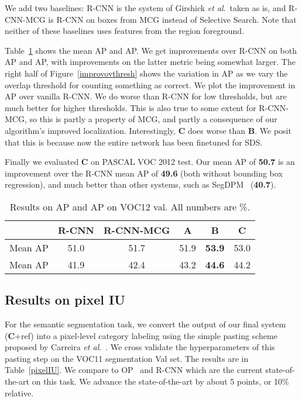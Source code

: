\documentclass[runningheads]{llncs}
\newcommand\etal{\emph{et al}.\ }
\newcommand\methodA{\textbf{A}}
\newcommand\methodB{\textbf{B}}
\newcommand\methodC{\textbf{C}}
\begin{document}
We add two baselines: R-CNN is the system of Girshick \etal taken as is, and R-CNN-MCG is R-CNN on boxes from MCG instead of Selective Search. Note that neither of these baselines uses features from the region foreground.

Table~\ref{APb} shows the mean AP and AP. We get improvements over R-CNN on both AP and AP, with improvements on the latter metric being somewhat larger. The right half of Figure~\ref{improvovthresh} shows the variation in AP as we vary the overlap threshold for counting something as correct. We plot the improvement in AP over vanilla R-CNN. We do worse than R-CNN for low thresholds, but are much better for higher thresholds. This is also true to some extent for R-CNN-MCG, so this is partly a property of MCG, and partly a consequence of our algorithm's improved localization. Interestingly, \methodC{} does worse than \methodB{}. We posit that this is because now the entire network has been finetuned for SDS.

Finally we evaluated \methodC{} on PASCAL VOC 2012 test. Our mean AP of \textbf{50.7} is an improvement over the R-CNN mean AP of \textbf{49.6} (both without bounding box regression), and much better than other systems, such as  SegDPM~\cite{FidlerCVPR13} (\textbf{40.7}). 
\begin{table}
\centering
\caption{ Results on AP and AP on VOC12 val. All numbers are \%.}
\begin{tabular}{l|ccccc}
& R-CNN\cite{GirshickCVPR14} & R-CNN-MCG & \methodA{} &\methodB{}& \methodC{}\\
\hline
Mean AP & 51.0 & 51.7 & 51.9 \; & \textbf{53.9} \; & 53.0 \\
Mean AP& 41.9 & 42.4 & 43.2 \; & \textbf{44.6} \; & 44.2
\end{tabular}
\label{APb}
\end{table}
\subsection{Results on pixel IU}
For the semantic segmentation task, we convert the output of our final system (\methodC{}+ref) into a pixel-level category labeling using the simple pasting scheme proposed by Carreira \etal\cite{CarreiraECCV12}. We cross validate the hyperparameters of this pasting step on the VOC11 segmentation Val set. The results are  in Table~\ref{pixelIU}. We compare to OP~\cite{CarreiraECCV12} and R-CNN which are the current state-of-the-art on this task. We advance the state-of-the-art by about 5 points, or 10\% relative.
\end{document}
